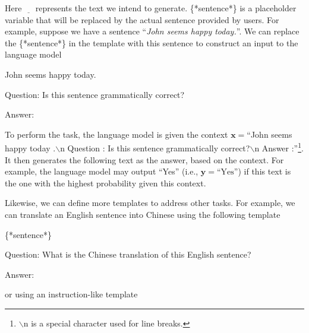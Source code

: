 \noindent Here $\underline{\hspace{1em}}$ represents the text we intend to generate. \{*sentence*\} is a placeholder variable that will be replaced by the actual sentence provided by users. For example, suppose we have a sentence ``\textit{John seems happy today.}''. We can replace the \{*sentence*\} in the template with this sentence to construct an input to the language model

\vspace{0.5em}
\begin{tcolorbox}
\hspace{4em} John seems happy today.

\hspace{4em} Question: Is this sentence grammatically correct?

\hspace{4em} Answer: \underline{\hspace{2em}}
\end{tcolorbox}
\vspace{0.5em}


To perform the task, the language model is given the context $\mathbf{x}=$``John seems happy today .$\backslash$n Question : Is this sentence grammatically correct?$\backslash$n Answer :''\footnote{$\backslash$n is a special character used for line breaks.}. It then generates the following text as the answer, based on the context. For example, the language model may output ``Yes'' (i.e., $\mathbf{y} = \textrm{``Yes''}$) if this text is the one with the highest probability given this context.

Likewise, we can define more templates to address other tasks. For example, we can translate an English sentence into Chinese using the following template

\vspace{0.5em}
\begin{tcolorbox}
\hspace{4em} \{*sentence*\}

\hspace{4em} Question: What is the Chinese translation of this English sentence?

\hspace{4em} Answer: \underline{\hspace{2em}}
\end{tcolorbox}
\vspace{0.5em}

\noindent or using an instruction-like template

